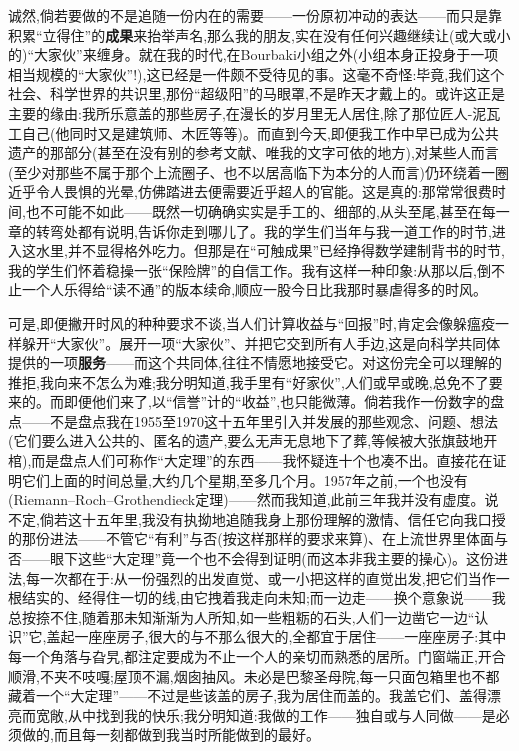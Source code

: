 诚然,倘若要做的不是追随一份内在的需要——一份原初冲动的表达——而只是靠积累“立得住”的\textbf{成果}来抬举声名,那么我的朋友,实在没有任何兴趣继续让(或大或小的)“大家伙”来缠身。就在我的时代,在Bourbaki小组之外(小组本身正投身于一项相当规模的“大家伙”!),这已经是一件颇不受待见的事。这毫不奇怪:毕竟,我们这个社会、科学世界的共识里,那份“超级阳”的马眼罩,不是昨天才戴上的。或许这正是主要的缘由:我所乐意盖的那些房子,在漫长的岁月里无人居住,除了那位匠人-泥瓦工自己(他同时又是建筑师、木匠等等)。而直到今天,即便我工作中早已成为公共遗产的那部分(甚至在没有别的参考文献、唯我的文字可依的地方),对某些人而言(至少对那些不属于那个上流圈子、也不以居高临下为本分的人而言)仍环绕着一圈近乎令人畏惧的光晕,仿佛踏进去便需要近乎超人的官能。这是真的:那常常很费时间,也不可能不如此——既然一切确确实实是手工的、细部的,从头至尾,甚至在每一章的转弯处都有说明,告诉你走到哪儿了。我的学生们当年与我一道工作的时节,进入这水里,并不显得格外吃力。但那是在“可触成果”已经挣得数学建制背书的时节,我的学生们怀着稳操一张“保险牌”的自信工作。我有这样一种印象:从那以后,倒不止一个人乐得给“读不通”的版本续命,顺应一股今日比我那时暴虐得多的时风。

可是,即便撇开时风的种种要求不谈,当人们计算收益与“回报”时,肯定会像躲瘟疫一样躲开“大家伙”。展开一项“大家伙”、并把它交到所有人手边,这是向科学共同体提供的一项\textbf{服务}——而这个共同体,往往不情愿地接受它。对这份完全可以理解的推拒,我向来不怎么为难;我分明知道,我手里有“好家伙”,人们或早或晚,总免不了要来的\dmark{}。而即便他们来了,以“信誉”计的“收益”,也只能微薄。倘若我作一份数字的盘点——不是盘点我在1955至1970这十五年里引入并发展的那些观念、问题、想法(它们要么进入公共的、匿名的遗产,要么无声无息地下了葬,等候被大张旗鼓地开棺),而是盘点人们可称作“大定理”的东西——我怀疑连十个也凑不出。直接花在证明它们上面的时间总量,大约几个星期,至多几个月。1957年之前,一个也没有(Riemann--Roch--Grothendieck定理)——然而我知道,此前三年我并没有虚度。说不定,倘若这十五年里,我没有执拗地追随我身上那份理解的激情、信任它向我口授的那份进法——不管它“有利”与否(按这样那样的要求来算)、在上流世界里体面与否——眼下这些“大定理”竟一个也不会得到证明(而这本非我主要的操心)。这份进法,每一次都在于:从一份强烈的出发直觉、或一小把这样的直觉出发,把它们当作一根结实的、经得住一切的线,由它拽着我走向未知;而一边走——换个意象说——我总按捺不住,随着那未知渐渐为人所知,如一些粗粝的石头,人们一边凿它一边“认识”它,盖起一座座房子,很大的与不那么很大的,全都宜于居住——一座座房子:其中每一个角落与旮旯,都注定要成为不止一个人的亲切而熟悉的居所。门窗端正,开合顺滑,不夹不吱嘎;屋顶不漏,烟囱抽风。未必是巴黎圣母院,每一只面包箱里也不都藏着一个“大定理”——不过是些该盖的房子,我为居住而盖的。我盖它们、盖得漂亮而宽敞,从中找到我的快乐;我分明知道:我做的工作——独自或与人同做——是必须做的,而且每一刻都做到我当时所能做到的最好。

